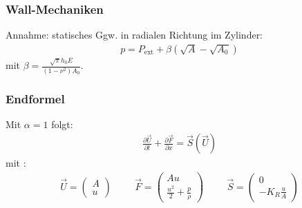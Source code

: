 \begin{frame}
\frametitle{Wall-Mechaniken}
Annahme: statisches Ggw. in radialen Richtung im Zylinder:
\begin{align}
p=P_\text{ext}+\beta(\sqrt{A}-\sqrt{A_0})
\end{align}
mit $\beta = \frac{\sqrt{\pi}h_0E}{(1-\nu^2)A_0}$.
\end{frame}
\begin{frame}
\frametitle{\textbf{Endformel}}
Mit $\alpha=1$ folgt:
\begin{align}
\boxed{\frac{\partial \vec{U}}{\partial t}+\frac{\partial \vec{F}}{\partial x}=\vec{S}(\vec{U})}
\end{align}
mit :
\begin{align*}
\vec{U}=\begin{pmatrix} A \\ u \end{pmatrix} \hspace{1cm} \vec{F}=\begin{pmatrix} Au \\ \frac{u^2}{2} + \frac{p}{\rho}
\end{pmatrix} \hspace{1cm} \vec{S}=\begin{pmatrix} 0 \\ -K_R \frac{u}{A}
\end{pmatrix}
\end{align*}
\end{frame}